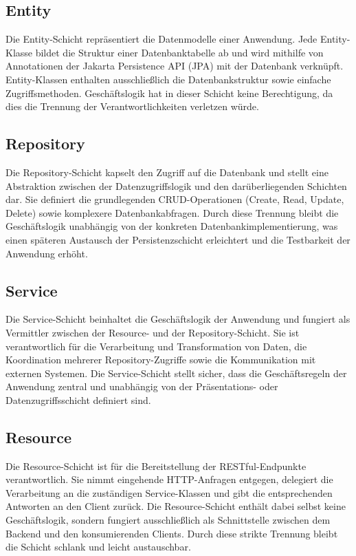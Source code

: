 \subsection{Entity}

Die Entity-Schicht repräsentiert die Datenmodelle einer Anwendung. Jede Entity-Klasse
bildet die Struktur einer Datenbanktabelle ab und wird mithilfe von Annotationen der
Jakarta Persistence API (JPA) mit der Datenbank verknüpft. Entity-Klassen enthalten
ausschließlich die Datenbankstruktur sowie einfache Zugriffsmethoden. Geschäftslogik
hat in dieser Schicht keine Berechtigung, da dies die Trennung der Verantwortlichkeiten
verletzen würde.

\subsection{Repository}

Die Repository-Schicht kapselt den Zugriff auf die Datenbank und stellt eine
Abstraktion zwischen der Datenzugriffslogik und den darüberliegenden Schichten dar.
Sie definiert die grundlegenden CRUD-Operationen (Create, Read, Update, Delete) sowie
komplexere Datenbankabfragen. Durch diese Trennung bleibt die Geschäftslogik
unabhängig von der konkreten Datenbankimplementierung, was einen späteren Austausch
der Persistenzschicht erleichtert und die Testbarkeit der Anwendung erhöht.

\subsection{Service}

Die Service-Schicht beinhaltet die Geschäftslogik der Anwendung und fungiert als
Vermittler zwischen der Resource- und der Repository-Schicht. Sie ist verantwortlich
für die Verarbeitung und Transformation von Daten, die Koordination mehrerer
Repository-Zugriffe sowie die Kommunikation mit externen Systemen. Die Service-Schicht
stellt sicher, dass die Geschäftsregeln der Anwendung zentral und unabhängig von
der Präsentations- oder Datenzugriffsschicht definiert sind.

\subsection{Resource}

Die Resource-Schicht ist für die Bereitstellung der RESTful-Endpunkte verantwortlich.
Sie nimmt eingehende HTTP-Anfragen entgegen, delegiert die Verarbeitung an die
zuständigen Service-Klassen und gibt die entsprechenden Antworten an den Client zurück.
Die Resource-Schicht enthält dabei selbst keine Geschäftslogik, sondern fungiert
ausschließlich als Schnittstelle zwischen dem Backend und den konsumierenden Clients.
Durch diese strikte Trennung bleibt die Schicht schlank und leicht austauschbar.

